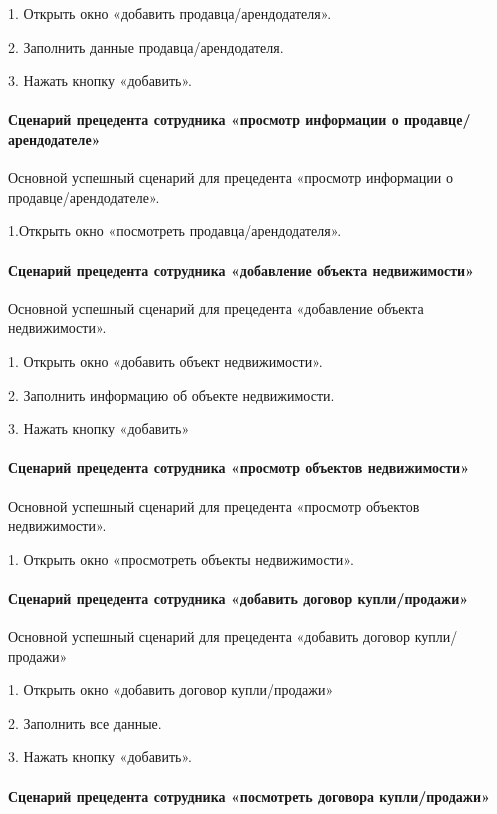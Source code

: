 1.	Открыть окно «добавить продавца/арендодателя».

2.	Заполнить данные продавца/арендодателя.

3.	Нажать кнопку «добавить».

\paragraph{Сценарий прецедента сотрудника «просмотр информации о продавце/арендодателе»}

Основной успешный сценарий для прецедента «просмотр информации о продавце/арендодателе».

1.Открыть окно «посмотреть продавца/арендодателя».

\paragraph{Сценарий прецедента сотрудника «добавление объекта недвижимости»}

Основной успешный сценарий для прецедента «добавление объекта недвижимости».

1.	Открыть окно «добавить объект недвижимости».

2.	Заполнить информацию об объекте недвижимости.

3.	Нажать кнопку «добавить»

\paragraph{Сценарий прецедента сотрудника «просмотр объектов недвижимости»}

Основной успешный сценарий для прецедента «просмотр объектов недвижимости».

1.	Открыть окно «просмотреть объекты недвижимости».

\paragraph{Сценарий прецедента сотрудника «добавить договор купли/продажи»}

Основной успешный сценарий для прецедента «добавить договор купли/продажи»

1.	Открыть окно «добавить договор купли/продажи»

2.	Заполнить все данные.

3.	Нажать кнопку «добавить».

\paragraph{Сценарий прецедента сотрудника «посмотреть договора купли/продажи»}

